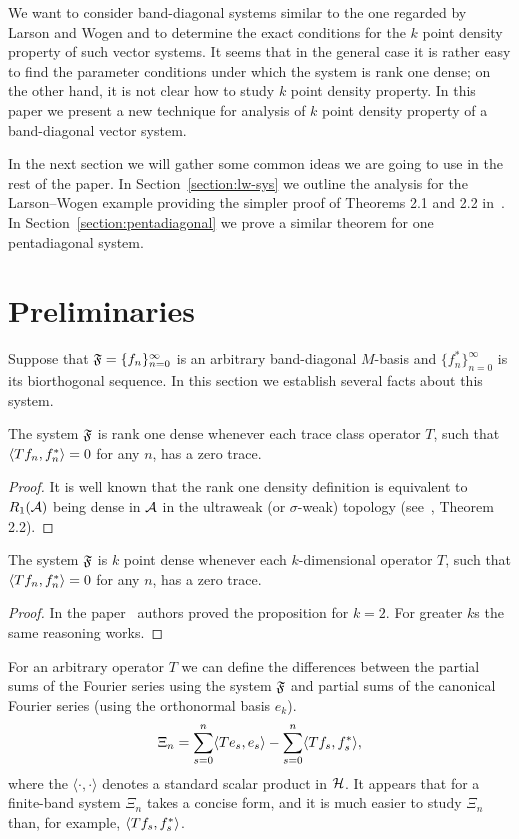 \documentclass[12pt]{amsart}
\theoremstyle{case}
\begin{document}
    We want to consider band-diagonal systems similar to the one regarded by Larson and Wogen and to determine the exact conditions
      for the $k$ point density property of such vector systems.
    It seems that in the general case it is rather easy to find the parameter conditions under which the system is rank one dense;
      on the other hand, it is not clear how to study $k$ point density property.
    In this paper we present a new technique for analysis of $k$ point density property of a band-diagonal vector system.

    In the next section we will gather some common ideas we are going to use in the rest of the paper.
    In Section~\ref{section:lw-sys} we outline the analysis for the Larson--Wogen example providing the simpler proof of Theorems 2.1 and 2.2 in~\cite{katavolos}.
    In Section~\ref{section:pentadiagonal} we prove a similar theorem for one pentadiagonal system.
\section{Preliminaries}
  Suppose that $\fsys=\{f_n\}_{n=0}^\infty$ is an arbitrary band-diagonal $M$-basis and $\{f^*_n\}_{n=0}^\infty$ is its biorthogonal sequence.
  In this section we establish several facts about this system.
  \begin{prop}
    The system $\fsys$ is rank one dense whenever each trace class operator $T$,
      such that $\inner{Tf_n}{f_n^*} = 0$ for any $n$, has a zero trace.
  \end{prop}
  \begin{proof}
    It is well known that the rank one density definition is equivalent to $R_1(\cal{A})$ being dense
      in $\cal{A}$ in the ultraweak (or $\sigma$-weak) topology (see~\cite{katavolos}, Theorem 2.2).
  \end{proof}
  \begin{prop}
    The system $\fsys$ is $k$ point dense whenever each $k$-dimensional operator $T$,
      such that $\inner{Tf_n}{f_n^*} = 0$ for any $n$, has a zero trace.
  \end{prop}
  \begin{proof}
    In the paper~\cite{katavolos} authors proved the proposition for $k = 2$.
    For greater $k$s the same reasoning works.
  \end{proof}
  For an arbitrary operator $T$ we can define the differences between
    the partial sums of the Fourier series using the system $\fsys$ and
    partial sums of the canonical Fourier series (using the orthonormal basis $e_k$).
  \begin{equation}
    \label{eq:xi}
    \Xi_n = \sum_{s=0}^n \inner{Te_s}{e_s} - \sum_{s=0}^n \inner{Tf_s}{f_s^*},
  \end{equation}
    where the $\langle \cdot, \cdot\rangle$ denotes a standard scalar product in $\cal{H}$.
  It appears that for a finite-band system $\Xi_n$ takes a concise form, and it is much easier to study $\Xi_n$
    than, for example, $\inner{Tf_s}{f_s^*}$.
\end{document}
